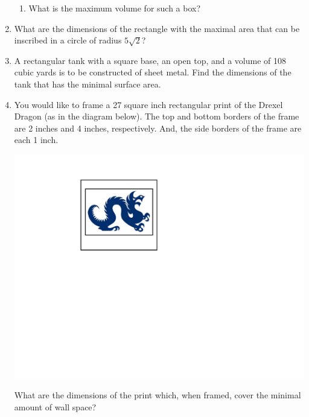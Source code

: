 \documentclass[12pt]{article}
\newif\ifans
\begin{document}
\begin{enumerate}
\begin{enumerate}
\item What is the maximum volume for such a box?

\ifans{\fbox{72 cubic inches}} \fi

\end{enumerate}

\item What are the dimensions of the rectangle with the maximal area that can be inscribed in a circle of radius $5\sqrt{2}$?

\ifans{\fbox{10 by 10}} \fi

\item A rectangular tank with a square base, an open top, and a volume of 108 cubic yards is to be constructed of sheet metal.  Find the dimensions of the tank that has the minimal surface area.

\ifans{\fbox{6 yards by 6 yards by 3 yards}} \fi

\item You would like to frame a 27 square inch rectangular print of the Drexel Dragon (as in the diagram below).  The top and bottom borders of the frame are 2 inches and 4 inches, respectively.  And, the side borders of the frame are each 1 inch.

\begin{center}
\includegraphics[scale=0.7]{mario.pdf}
\end{center}

What are the dimensions of the print which, when framed, cover the minimal amount of wall space?

\ifans{\fbox{The print should be 3 inches by 9 inches}} \fi


\end{enumerate}
\end{document}
